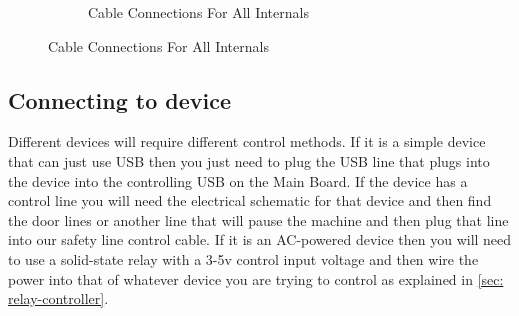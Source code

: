 \begin{figure}[H]
\begin{subfigure}{.45\textwidth}
            \caption{Cable Connections For All Internals}
            \label{fig:Final Cable Connections}
        \end{subfigure}
    \end{figure}
\subsection{Connecting to device}
Different devices will require different control methods. If it is a simple device that can just use USB then you just need to plug the USB line that plugs into the device into the controlling USB on the Main Board. If the device has a control line you will need the electrical schematic for that device and then find the door lines or another line that will pause the machine and then plug that line into our safety line control cable. If it is an AC-powered device then you will need to use a solid-state relay with a 3-5v control input voltage and then wire the power into that of whatever device you are trying to control as explained in \cref{sec: relay-controller}.